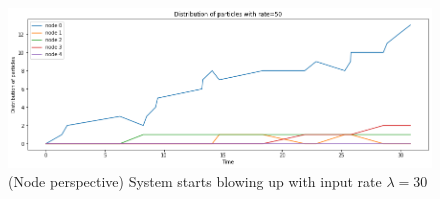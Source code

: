 \documentclass[
	12pt, %
]{fphw}
\begin{document}
\begin{enumerate}[a)\normalfont]
    \begin{figure}[H]
        \centering
    	\includegraphics[width=0.8\columnwidth]{P3blow.png} 
    	\caption{(Node perspective) System starts blowing up with input rate $\lambda = 30$}
    	\label{fig:P3blow}
    \end{figure}
    
\end{enumerate}


\end{document}
